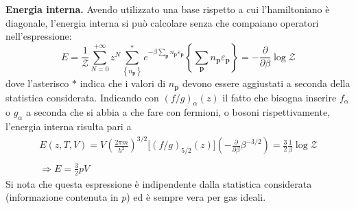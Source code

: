 \documentclass[11pt, a4paper]{scrartcl}
\theoremstyle{style}
\theoremstyle{style1}
\numberwithin{equation}{subsection}
\begin{document}
\textbf{Energia interna.} Avendo utilizzato una base rispetto a cui l'hamiltoniano \`e diagonale, l'energia interna si pu\`o calcolare senza che compaiano operatori nell'espressione:
\[
E = \frac{1}{\mathcal{Z}}\sum_{N=0}^{+\infty} z^N \sum_{\left\{ n_\mathbf{p}  \right\} }^{*} e^{-\beta \sum_{\mathbf{p} }^{} n_\mathbf{p} \varepsilon _\mathbf{p} } \left\{ \sum_{\mathbf{p} }^{} n_\mathbf{p} \varepsilon _\mathbf{p}  \right\} = - \frac{\partial }{\partial \beta } \log\mathcal{Z} 
\] 
dove l'asterisco $*$ indica che i valori di $n_\mathbf{p} $ devono essere aggiustati a seconda della statistica considerata.
Indicando con $(f / g)_\alpha (z)$ il fatto che bisogna inserire $f_\alpha $ o $g_\alpha $ a seconda che si abbia a che fare con fermioni, o bosoni rispettivamente, l'energia interna risulta pari a 
\begin{equation}\label{giei}
	\begin{array}
		{c}
\displaystyle E(z,T,V)  =V \left(\frac{2\pi m }{h^2}\right) ^{3 / 2} \Big[ (f / g)_{5 / 2} (z) \Big]  \left(-\frac{\partial }{\partial \beta } \beta ^{-3 / 2}\right) = \frac{3}{2} \frac{1}{\beta } \log \mathcal{Z} \\
\\
\displaystyle \Rightarrow E = \frac{3}{2}pV
	\end{array}
\end{equation}
Si nota che questa espressione \`e indipendente dalla statistica considerata (informazione contenuta in $p$) ed \`e sempre vera per gas ideali.
\end{document}
